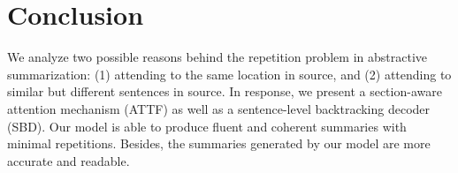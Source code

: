 \section{Conclusion}
\label{sec:conclude}
We analyze two possible reasons behind the repetition problem in abstractive
summarization: (1) attending to the same location in source,
and (2) attending to similar but different sentences in source. 
In response, we present a section-aware attention mechanism (ATTF)
as well as a sentence-level backtracking decoder (SBD). Our model is able 
to produce fluent and coherent summaries with minimal repetitions.
Besides, the summaries generated by our model are more accurate and 
readable. 

